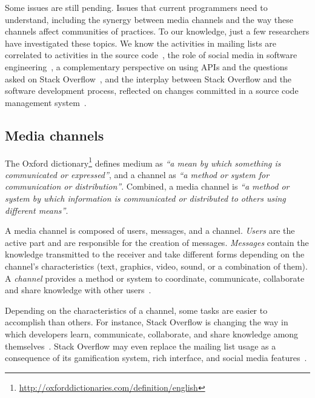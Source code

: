     Some issues are still pending.
    Issues that current programmers need to understand, including the synergy between media channels and the way these channels affect communities of practices.
    To our knowledge, just a few researchers have investigated these topics.
    We know the activities in mailing lists are correlated to activities in the source code~\cite{Bird2006}, the role of social media in software engineering~\cite{Storey2014, Storey2010}, a complementary perspective on using APIs and the questions asked on Stack Overflow~\cite{Kavaler2013}, and the interplay between Stack Overflow and the software development process, reflected on changes committed in a source code management system~\cite{Vasilescu2013a}.

\subsection{Media channels}

    The Oxford dictionary\footnote{\url{http://oxforddictionaries.com/definition/english}} defines medium as \textit{``a mean by which something is communicated or expressed''}, and a channel as \textit{``a method or system for communication or distribution''}.
    Combined, a media channel is \textit{``a method or system by which information is communicated or distributed to others using different means''}.

    A media channel is composed of users, messages, and a channel.
    \textit{Users} are the active part and are responsible for the creation of messages.
    \textit{Messages} contain the knowledge transmitted to the receiver and take different forms depending on the channel's characteristics (text, graphics, video, sound, or a combination of them).
    A \textit{channel} provides a method or system to coordinate, communicate, collaborate and share knowledge with other users~\cite{Storey2014}.

Depending on the characteristics of a channel, some tasks are easier to accomplish than others.
For instance, Stack Overflow is changing the way in which developers learn, communicate, collaborate, and share knowledge among themselves~\cite{Storey2014}.
Stack Overflow may even replace the mailing list usage as a consequence of its gamification system, rich interface, and social media features~\cite{Vasilescu2014b}.


